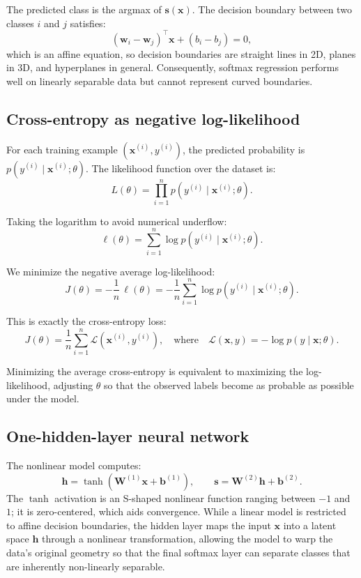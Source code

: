 \documentclass[sigconf,screen,nonacm]{acmart}
\newcommand{\vx}{\mathbf{x}}
\newcommand{\vs}{\mathbf{s}}
\newcommand{\vh}{\mathbf{h}}
\newcommand{\vbone}{\mathbf{b}^{(1)}}
\newcommand{\vbtwo}{\mathbf{b}^{(2)}}
\newcommand{\mWone}{\mathbf{W}^{(1)}}
\newcommand{\mWtwo}{\mathbf{W}^{(2)}}
\begin{document}
The predicted class is the argmax of $\vs(\vx)$. The decision boundary between two classes $i$ and $j$ satisfies:
\begin{equation}
\left(\mathbf{w}_i - \mathbf{w}_j\right)^{\top} \mathbf{x} + \left(b_i - b_j\right) = 0,
\end{equation}
which is an affine equation, so decision boundaries are straight lines in 2D, planes in 3D, and hyperplanes in general. Consequently, softmax regression performs well on linearly separable data but cannot represent curved boundaries.

\subsection{Cross-entropy as negative log-likelihood}

For each training example $(\mathbf{x}^{(i)}, y^{(i)})$, the predicted probability is $p(y^{(i)} \mid \mathbf{x}^{(i)}; \theta)$.
The likelihood function over the dataset is:
\begin{equation}
L(\theta) = \prod_{i=1}^{n} p\!\left(y^{(i)} \mid \mathbf{x}^{(i)}; \theta\right).
\end{equation}

Taking the logarithm to avoid numerical underflow:
\begin{equation}
\ell(\theta) = \sum_{i=1}^{n} \log p\!\left(y^{(i)} \mid \mathbf{x}^{(i)}; \theta\right).
\end{equation}

We minimize the negative average log-likelihood:
\begin{equation}
J(\theta) = -\frac{1}{n}\,\ell(\theta)
= -\frac{1}{n} \sum_{i=1}^{n} \log p\!\left(y^{(i)} \mid \mathbf{x}^{(i)}; \theta\right).
\end{equation}

This is exactly the cross-entropy loss:
\begin{equation}
J(\theta) = \frac{1}{n} \sum_{i=1}^{n} \mathcal{L}(\mathbf{x}^{(i)}, y^{(i)}),
\quad\text{where}\quad
\mathcal{L}(\mathbf{x}, y) = -\log p(y \mid \mathbf{x}; \theta).
\end{equation}

Minimizing the average cross-entropy is equivalent to maximizing the log-likelihood, adjusting $\theta$ so that the observed labels become as probable as possible under the model.

\subsection{One-hidden-layer neural network}
The nonlinear model computes:
\begin{equation}
    \vh = \tanh\!\left(\mWone \vx + \vbone\right), \qquad \vs = \mWtwo \vh + \vbtwo.
\end{equation}
The $\tanh$ activation is an S-shaped nonlinear function ranging between $-1$ and $1$; it is zero-centered, which aids convergence. While a linear model is restricted to affine decision boundaries, the hidden layer maps the input $\vx$ into a latent space $\vh$ through a nonlinear transformation, allowing the model to warp the data's original geometry so that the final softmax layer can separate classes that are inherently non-linearly separable.
\end{document}
